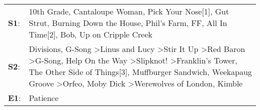 \begin{supertabular}{p{0.03\textwidth}p{0.92\textwidth}}
 \textbf{S1}:  &                                                                                                                                                                                                                                                                                                                                                         10th Grade\textsuperscript{}, \enspace Cantaloupe Woman\textsuperscript{}, \enspace Pick Your Nose[1]\textsuperscript{}, \enspace Gut Strut\textsuperscript{}, \enspace Burning Down the House\textsuperscript{}, \enspace Phil's Farm\textsuperscript{}, \enspace FF\textsuperscript{}, \enspace All In Time[2]\textsuperscript{}, \enspace Bob\textsuperscript{}, \enspace Up on Cripple Creek\textsuperscript{}  \enspace  \\
 \textbf{S2}:  &  Divisions\textsuperscript{}, \enspace G-Song\textsuperscript{} \textgreater \enspace Linus and Lucy\textsuperscript{} \textgreater \enspace Stir It Up\textsuperscript{} \textgreater \enspace Red Baron\textsuperscript{} \textgreater \enspace G-Song\textsuperscript{}, \enspace Help On the Way\textsuperscript{} \textgreater \enspace Slipknot!\textsuperscript{} \textgreater \enspace Franklin's Tower\textsuperscript{}, \enspace The Other Side of Things[3]\textsuperscript{}, \enspace Muffburger Sandwich\textsuperscript{}, \enspace Weekapaug Groove\textsuperscript{} \textgreater \enspace Orfeo\textsuperscript{}, \enspace Moby Dick\textsuperscript{} \textgreater \enspace Werewolves of London\textsuperscript{}, \enspace Kimble\textsuperscript{}  \enspace  \\
 \textbf{E1}:  &                                                                                                                                                                                                                                                                                                                                                                                                                                                                                                                                                                                                                                                                                                                                                 Patience\textsuperscript{}  \enspace  \\
\end{supertabular}
